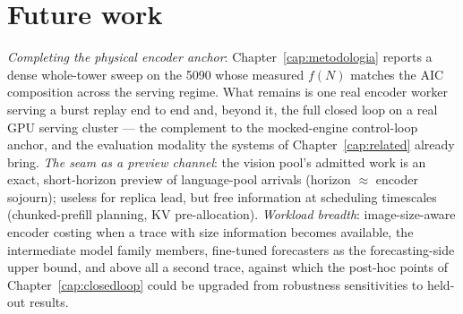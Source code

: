 \section{Future work}
\label{sec:conc-future}

\emph{Completing the physical encoder anchor}:
Chapter~\ref{cap:metodologia} reports a dense whole-tower sweep on the 5090
whose measured $f(N)$ matches the AIC composition across the serving regime.
What remains is one real encoder worker serving a burst replay end to end
and, beyond it, the full closed loop on a real GPU serving cluster --- the
complement to the mocked-engine control-loop anchor, and the evaluation
modality the systems of Chapter~\ref{cap:related} already bring. \emph{The
seam as a preview channel}: the vision pool's admitted work is an exact,
short-horizon preview of language-pool arrivals (horizon $\approx$ encoder
sojourn); useless for replica lead, but free information at scheduling
timescales (chunked-prefill planning, KV pre-allocation). \emph{Workload
breadth}: image-size-aware encoder costing when a trace with size
information becomes available, the intermediate model family members,
fine-tuned forecasters as the forecasting-side upper bound, and above all a
second trace, against which the post-hoc points of
Chapter~\ref{cap:closedloop} could be upgraded from robustness sensitivities
to held-out results.
